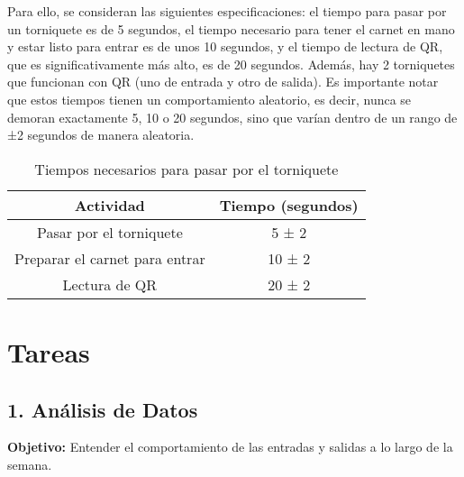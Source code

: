 \documentclass[12pt]{article}
\begin{document}
Para ello, se consideran las siguientes especificaciones: el tiempo para pasar por un torniquete es de 5 segundos, el tiempo necesario para tener el carnet en mano y estar listo para entrar es de unos 10 segundos, y el tiempo de lectura de QR, que es significativamente más alto, es de 20 segundos. Además, hay 2 torniquetes que funcionan con QR (uno de entrada y otro de salida). Es importante notar que estos tiempos tienen un comportamiento aleatorio, es decir, nunca se demoran exactamente 5, 10 o 20 segundos, sino que varían dentro de un rango de ±2 segundos de manera aleatoria.

\begin{table}[h!]
    \centering
    \begin{tabular}{|c|c|}
        \hline
        \textbf{Actividad} & \textbf{Tiempo (segundos)} \\ \hline
        Pasar por el torniquete & 5 ± 2 \\ \hline
        Preparar el carnet para entrar & 10 ± 2 \\ \hline
        Lectura de QR & 20 ± 2 \\ \hline
    \end{tabular}
    \caption{Tiempos necesarios para pasar por el torniquete}
    \label{tab:times}
\end{table}

\section*{Tareas}

\subsection*{1. Análisis de Datos}
\textbf{Objetivo:} Entender el comportamiento de las entradas y salidas a lo largo de la semana.
\end{document}
